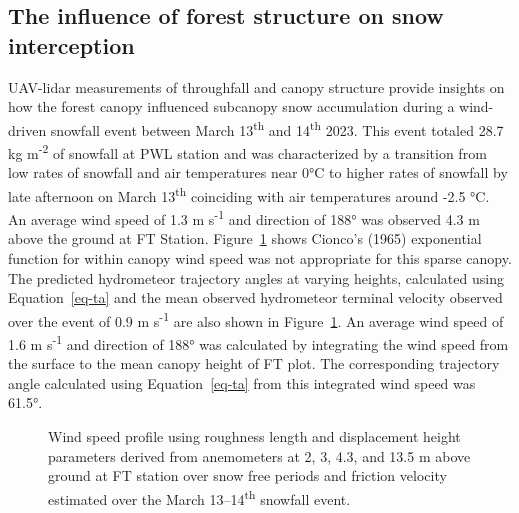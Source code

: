 \documentclass[
  letterpaper,
  DIV=11,
  numbers=noendperiod]{scrartcl}
\begin{document}
\subsection{The influence of forest structure on snow
interception}\label{the-influence-of-forest-structure-on-snow-interception}

UAV-lidar measurements of throughfall and canopy structure provide
insights on how the forest canopy influenced subcanopy snow accumulation
during a wind-driven snowfall event between March 13\textsuperscript{th}
and 14\textsuperscript{th} 2023. This event totaled 28.7 kg
m\textsuperscript{-2} of snowfall at PWL station and was characterized
by a transition from low rates of snowfall and air temperatures near 0°C
to higher rates of snowfall by late afternoon on March
13\textsuperscript{th} coinciding with air temperatures around -2.5 °C.
An average wind speed of 1.3 m s\textsuperscript{-1} and direction of
188° was observed 4.3 m above the ground at FT Station.
Figure~\ref{fig-wind-profiles} shows Cionco's (1965) exponential
function for within canopy wind speed was not appropriate for this
sparse canopy. The predicted hydrometeor trajectory angles at varying
heights, calculated using Equation~\ref{eq-ta} and the mean observed
hydrometeor terminal velocity observed over the event of 0.9 m
s\textsuperscript{-1} are also shown in Figure~\ref{fig-wind-profiles}.
An average wind speed of 1.6 m s\textsuperscript{-1} and direction of
188° was calculated by integrating the wind speed from the surface to
the mean canopy height of FT plot. The corresponding trajectory angle
calculated using Equation~\ref{eq-ta} from this integrated wind speed
was 61.5°.

\begin{figure}[H]


\caption{\label{fig-wind-profiles}Wind speed profile using roughness
length and displacement height parameters derived from anemometers at 2,
3, 4.3, and 13.5 m above ground at FT station over snow free periods and
friction velocity estimated over the March 13--14\textsuperscript{th}
snowfall event.}

\end{figure}%
\end{document}
